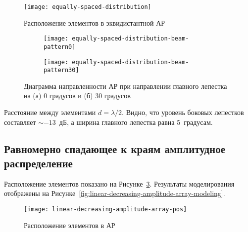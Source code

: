 \begin{figure}[!ht]
    \centering
    \texttt{[image: equally-spaced-distribution]}
    \caption{Расположение элементов в эквидистантной АР}
    \label{fig:equally-spaced-distribution-pos-modeling}
\end{figure}



\begin{figure}[!ht]
    \centering
    \begin{subfigure}[b]{0.49\textwidth}
        \centering
        \hspace*{-3ex}
        \texttt{[image: equally-spaced-distribution-beam-pattern0]}
        \caption{}%
    \end{subfigure}
    \hfill
    \begin{subfigure}[b]{0.49\textwidth}
        \centering
        \hspace*{-3ex}
        \texttt{[image: equally-spaced-distribution-beam-pattern30]}
        \caption{}%
    \end{subfigure}
    \caption{%
    Диаграмма направленности АР при направлении главного лепестка на (а) 0 градусов и (б) 30 градусов
    }%
    \label{fig:equally-spaced-distribution-modeling}
\end{figure}

Расстояние между элементами $d=\lambda/2$. Видно, что уровень боковых лепестков составляет $\sim-13$~дБ, 
а ширина главного лепестка равна 5~градусам.

\subsection{Равномерно спадающее к краям амплитудное распределение}

Расположение элементов показано на Рисунке~\ref{fig:linear-decreasing-amplitude-array-pos}. Результаты моделирования отображены на Рисунке~\ref{fig:linear-decreasing-amplitude-array-modeling}.

\begin{figure}[!ht]
    \centering
    \texttt{[image: linear-decreasing-amplitude-array-pos]}
    \caption{Расположение элементов в АР}
    \label{fig:linear-decreasing-amplitude-array-pos}
\end{figure}


